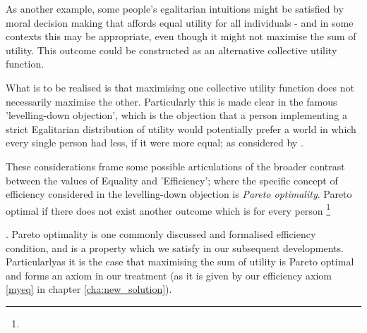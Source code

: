 \DIFdelend As another example, some people's egalitarian intuitions might be satisfied by moral decision making that affords equal utility for all individuals - and in some contexts this may be appropriate, even though it might not maximise the sum of utility. This outcome could be constructed as an alternative collective utility function.

What is to be realised is that maximising one collective utility function does not necessarily maximise the other.
Particularly this is made clear in the famous 'levelling-down objection', which \DIFaddbegin {}\DIFaddend is the objection that \DIFdelbegin \DIFdel{, }\DIFdelend a person implementing a strict Egalitarian distribution of utility would potentially prefer a world in which every single person had less, if it were more equal; as considered by \cite{equalityandpriorityparfit, temkin_2003}.

These considerations frame some possible articulations of the broader contrast between the values of Equality and 'Efficiency'; where the specific concept of efficiency considered in the levelling-down objection is \textit{Pareto optimality}.
\DIFdelbegin {}\DIFdelend \DIFaddbegin {}\DIFaddend Pareto optimal if there does not exist another outcome which is \DIFdelbegin {}\DIFdelend \DIFaddbegin {}\DIFaddend for every person \DIFdelbegin \footnote{}%
\addtocounter{footnote}{-1}%
\DIFdelend \DIFaddbegin {}\DIFaddend .
Pareto optimality is one commonly discussed and formalised efficiency condition, and is a property which we satisfy in our subsequent developments.
Particularly\DIFaddbegin \DIFadd{, }\DIFaddend as it is the case that maximising the sum of utility is Pareto optimal and forms an axiom in our treatment (as it is given by our efficiency axiom \eqref{myeq} in chapter \ref{cha:new_solution}).

